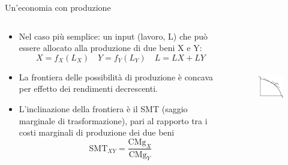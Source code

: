 \documentclass[aspectratio=64,12pt]{beamer}
\begin{document}
\begin{frame}{Un'economia con produzione}
\begin{columns}
\begin{column}{.5\columnwidth}
\begin{itemize}
\item Nel caso più semplice: un input (lavoro, L) che può essere allocato alla
produzione di due beni X e Y:
\begin{equation*}
X = f_X(L_X)\quad  Y = f_Y(L_Y)\quad L = LX + LY
\end{equation*}
\item La \alert{frontiera delle
possibilità di produzione} è concava per effetto dei rendimenti
decrescenti.
\item L’inclinazione della frontiera è il SMT (\alert{saggio marginale di trasformazione}), pari al rapporto tra i costi marginali di produzione dei due beni
\begin{equation*}
\text{SMT}_{XY}=\frac{\text{CMg}_X}{\text{CMg}_Y}
\end{equation*}
\end{itemize}
\end{column}


\begin{column}{.5\columnwidth}
\begin{figure}[htbp]
\centering
\includegraphics[height=5cm]{./figure/frontiere-1.pdf}
\end{figure}
\end{column}
\end{columns}
\end{frame}
\end{document}
